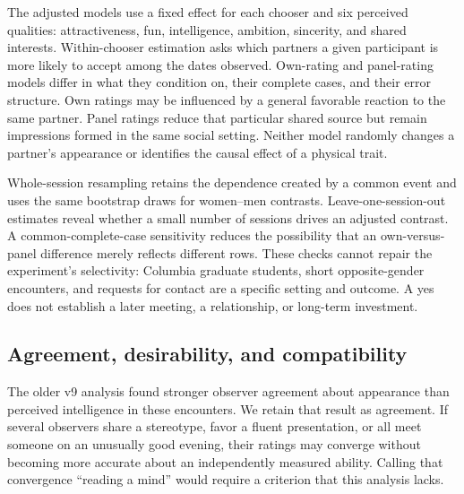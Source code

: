 


The adjusted models use a fixed effect for each chooser and six perceived qualities: attractiveness, fun, intelligence, ambition, sincerity, and shared interests. Within-chooser estimation asks which partners a given participant is more likely to accept among the dates observed. Own-rating and panel-rating models differ in what they condition on, their complete cases, and their error structure. Own ratings may be influenced by a general favorable reaction to the same partner. Panel ratings reduce that particular shared source but remain impressions formed in the same social setting. Neither model randomly changes a partner's appearance or identifies the causal effect of a physical trait.

Whole-session resampling retains the dependence created by a common event and uses the same bootstrap draws for women--men contrasts. Leave-one-session-out estimates reveal whether a small number of sessions drives an adjusted contrast. A common-complete-case sensitivity reduces the possibility that an own-versus-panel difference merely reflects different rows. These checks cannot repair the experiment's selectivity: Columbia graduate students, short opposite-gender encounters, and requests for contact are a specific setting and outcome. A yes does not establish a later meeting, a relationship, or long-term investment.

\subsection{Agreement, desirability, and compatibility}

The older v9 analysis found stronger observer agreement about appearance than perceived intelligence in these encounters. We retain that result as agreement. If several observers share a stereotype, favor a fluent presentation, or all meet someone on an unusually good evening, their ratings may converge without becoming more accurate about an independently measured ability. Calling that convergence ``reading a mind'' would require a criterion that this analysis lacks.

